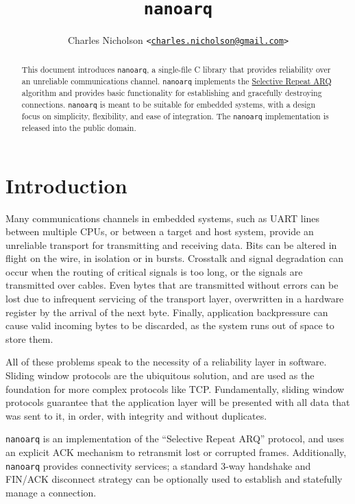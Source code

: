 \documentclass[11pt]{article}
\newcommand{\nanoarq}{\texttt{nanoarq}}
\begin{document}
\title{\nanoarq{}}
\author{Charles Nicholson \texttt{<\href{mailto:charles.nicholson@gmail.com}{charles.nicholson@gmail.com}>}}
\date{}
\maketitle

\begin{abstract}
    This document introduces \nanoarq{}, a single-file C library that provides reliability over an unreliable communications channel. \nanoarq{} implements the \href{https://en.wikipedia.org/wiki/Selective_Repeat_ARQ}{Selective Repeat ARQ}   algorithm and provides basic functionality for establishing and gracefully destroying connections. \nanoarq{} is meant to be suitable for embedded systems, with a design focus on simplicity, flexibility, and ease of integration. The \nanoarq{} implementation is released into the public domain.
\end{abstract}

\section{Introduction}
Many communications channels in embedded systems, such as UART lines between multiple CPUs, or between a target and host system, provide an unreliable transport for transmitting and receiving data. Bits can be altered in flight on the wire, in isolation or in bursts. Crosstalk and signal degradation can occur when the routing of critical signals is too long, or the signals are transmitted over cables. Even bytes that are transmitted without errors can be lost due to infrequent servicing of the transport layer, overwritten in a hardware register by the arrival of the next byte. Finally, application backpressure can cause valid incoming bytes to be discarded, as the system runs out of space to store them. \par
All of these problems speak to the necessity of a reliability layer in software. Sliding window protocols are the ubiquitous solution, and are used as the foundation for more complex protocols like TCP. Fundamentally, sliding window protocols guarantee that the application layer will be presented with all data that was sent to it, in order, with integrity and without duplicates. \par
\nanoarq{} is an implementation of the \enquote{Selective Repeat ARQ} protocol, and uses an explicit ACK mechanism to retransmit lost or corrupted frames. Additionally, \nanoarq{} provides connectivity services; a standard 3-way handshake and FIN/ACK disconnect strategy can be optionally used to establish and statefully manage a connection.
\end{document}
